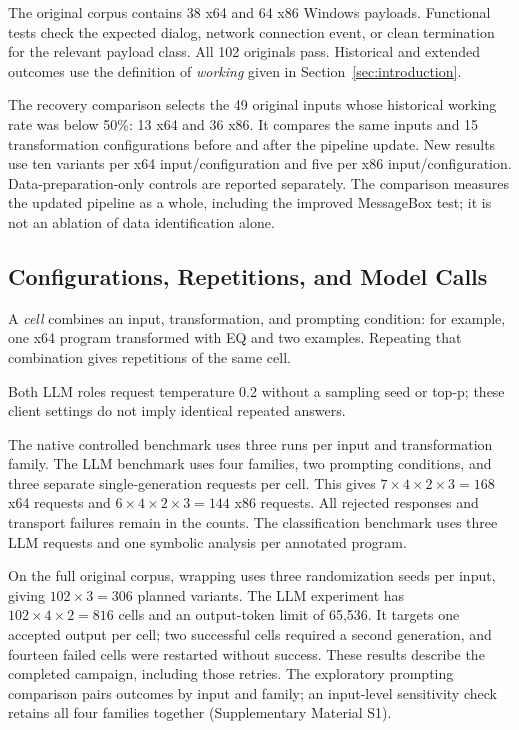 The original corpus contains 38 x64 and 64 x86 Windows payloads.
Functional tests check the expected dialog, network connection event,
or clean termination for the relevant payload class. All 102 originals pass.
Historical and extended outcomes use the definition of \emph{working}
given in Section~\ref{sec:introduction}.

The recovery comparison selects the 49 original inputs whose historical
working rate was below 50\%: 13 x64 and 36 x86. It compares the same
inputs and 15 transformation configurations before and after the
pipeline update. New results use ten variants per x64 input/configuration
and five per x86 input/configuration. Data-preparation-only controls are
reported separately. The comparison measures the updated pipeline as a
whole, including the improved MessageBox test; it is not an ablation of
data identification alone.

\subsection{Configurations, Repetitions, and Model Calls}
A \emph{cell} combines an input, transformation, and prompting condition:
for example, one x64 program transformed with EQ and two examples.
Repeating that combination gives repetitions of the same cell.

Both LLM roles request temperature 0.2 without a sampling seed or top-p;
these client settings do not imply identical repeated answers.

The native controlled benchmark uses three runs per input and transformation
family. The LLM benchmark uses four families, two prompting conditions,
and three separate single-generation requests per cell. This gives
$7\times4\times2\times3=168$ x64 requests and
$6\times4\times2\times3=144$ x86 requests. All rejected responses and
transport failures remain in the counts. The classification benchmark uses
three LLM requests and one symbolic analysis per annotated program.

On the full original corpus, wrapping uses three randomization seeds per
input, giving $102\times3=306$ planned variants. The LLM experiment has
$102\times4\times2=816$ cells and an output-token limit of 65,536.
It targets one accepted output per cell; two successful cells required a
second generation, and fourteen failed cells were restarted without success.
These results describe the completed campaign, including those retries.
The exploratory prompting comparison pairs outcomes by input and family;
an input-level sensitivity check retains all four families together
(Supplementary Material S1).

